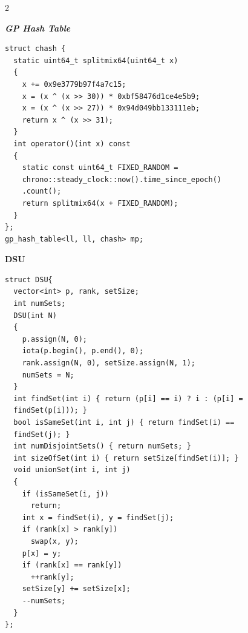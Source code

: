 \documentclass[10pt,a4paper]{article}
\begin{document}
\begin{paracol}{2}
\switchcolumn

\textbf{\textit{GP Hash Table}}
\begin{lstlisting}
struct chash {
  static uint64_t splitmix64(uint64_t x)
  {
    x += 0x9e3779b97f4a7c15;
    x = (x ^ (x >> 30)) * 0xbf58476d1ce4e5b9;
    x = (x ^ (x >> 27)) * 0x94d049bb133111eb;
    return x ^ (x >> 31);
  }
  int operator()(int x) const
  {
    static const uint64_t FIXED_RANDOM =
    chrono::steady_clock::now().time_since_epoch()
    .count();
    return splitmix64(x + FIXED_RANDOM);
  }
};
gp_hash_table<ll, ll, chash> mp;
\end{lstlisting}

\textbf{DSU}
\begin{lstlisting}
struct DSU{
  vector<int> p, rank, setSize;
  int numSets;
  DSU(int N)
  {
    p.assign(N, 0);
    iota(p.begin(), p.end(), 0);
    rank.assign(N, 0), setSize.assign(N, 1);
    numSets = N;
  }
  int findSet(int i) { return (p[i] == i) ? i : (p[i] =
  findSet(p[i])); }
  bool isSameSet(int i, int j) { return findSet(i) ==
  findSet(j); }
  int numDisjointSets() { return numSets; }
  int sizeOfSet(int i) { return setSize[findSet(i)]; }
  void unionSet(int i, int j)
  {
    if (isSameSet(i, j))
      return;
    int x = findSet(i), y = findSet(j);
    if (rank[x] > rank[y])
      swap(x, y);
    p[x] = y;
    if (rank[x] == rank[y])
      ++rank[y];
    setSize[y] += setSize[x];
    --numSets;
  }
};
\end{lstlisting}

\switchcolumn


\end{paracol}
\end{document}
